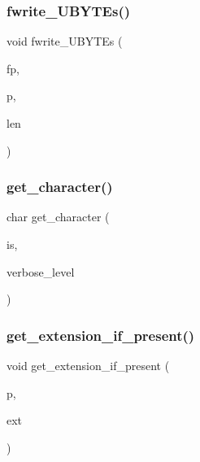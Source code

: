 \subsubsection{\texorpdfstring{fwrite\+\_\+\+U\+B\+Y\+T\+Es()}{fwrite\_UBYTEs()}}
{\footnotesize\ttfamily void fwrite\+\_\+\+U\+B\+Y\+T\+Es (\begin{DoxyParamCaption}\item[{F\+I\+LE $\ast$}]{fp,  }\item[{\mbox{\hyperlink{galois_8h_a122c4acf389c050379f00341fdcd5812}{U\+B\+Y\+TE}} $\ast$}]{p,  }\item[{\mbox{\hyperlink{galois_8h_a09fddde158a3a20bd2dcadb609de11dc}{I\+NT}}}]{len }\end{DoxyParamCaption})}

\mbox{\label{util_8_c_afa11b8d23080c55bbcf00b4ac4fc6045}} 
\subsubsection{\texorpdfstring{get\+\_\+character()}{get\_character()}}
{\footnotesize\ttfamily char get\+\_\+character (\begin{DoxyParamCaption}\item[{istream \&}]{is,  }\item[{\mbox{\hyperlink{galois_8h_a09fddde158a3a20bd2dcadb609de11dc}{I\+NT}}}]{verbose\+\_\+level }\end{DoxyParamCaption})}

\mbox{\label{util_8_c_a737197cad3c39e9690cbc9931edcba6b}} 
\subsubsection{\texorpdfstring{get\+\_\+extension\+\_\+if\+\_\+present()}{get\_extension\_if\_present()}}
{\footnotesize\ttfamily void get\+\_\+extension\+\_\+if\+\_\+present (\begin{DoxyParamCaption}\item[{const char $\ast$}]{p,  }\item[{char $\ast$}]{ext }\end{DoxyParamCaption})}

